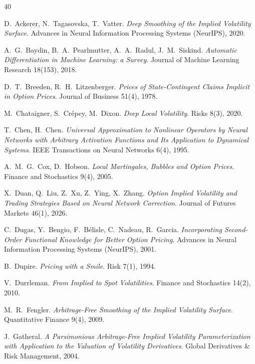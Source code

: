 \begin{thebibliography}{40}\small

 D.~Ackerer, N.~Tagasovska, T.~Vatter.
\emph{Deep Smoothing of the Implied Volatility Surface}. Advances in Neural Information
Processing Systems (NeurIPS), 2020.

 A.~G.~Baydin, B.~A.~Pearlmutter, A.~A.~Radul, J.~M.~Siskind.
\emph{Automatic Differentiation in Machine Learning: a Survey}. Journal of Machine Learning
Research 18(153), 2018.

 D.~T.~Breeden, R.~H.~Litzenberger.
\emph{Prices of State-Contingent Claims Implicit in Option Prices}. Journal of Business 51(4),
1978.

 M.~Chataigner, S.~Cr\'epey, M.~Dixon.
\emph{Deep Local Volatility}. Risks 8(3), 2020.

 T.~Chen, H.~Chen.
\emph{Universal Approximation to Nonlinear Operators by Neural Networks with Arbitrary
Activation Functions and Its Application to Dynamical Systems}. IEEE Transactions on Neural
Networks 6(4), 1995.

 A.~M.~G.~Cox, D.~Hobson.
\emph{Local Martingales, Bubbles and Option Prices}. Finance and Stochastics 9(4), 2005.

 X.~Duan, Q.~Liu, Z.~Xu, Z.~Ying, X.~Zhang.
\emph{Option Implied Volatility and Trading Strategies Based on Neural Network Correction}.
Journal of Futures Markets 46(1), 2026.

 C.~Dugas, Y.~Bengio, F.~B\'elisle, C.~Nadeau, R.~Garcia.
\emph{Incorporating Second-Order Functional Knowledge for Better Option Pricing}. Advances in
Neural Information Processing Systems (NeurIPS), 2001.

 B.~Dupire.
\emph{Pricing with a Smile}. Risk 7(1), 1994.

 V.~Durrleman.
\emph{From Implied to Spot Volatilities}. Finance and Stochastics 14(2), 2010.

 M.~R.~Fengler.
\emph{Arbitrage-Free Smoothing of the Implied Volatility Surface}. Quantitative Finance 9(4),
2009.

 J.~Gatheral.
\emph{A Parsimonious Arbitrage-Free Implied Volatility Parameterization with Application to the
Valuation of Volatility Derivatives}. Global Derivatives \& Risk Management, 2004.


\end{thebibliography}
